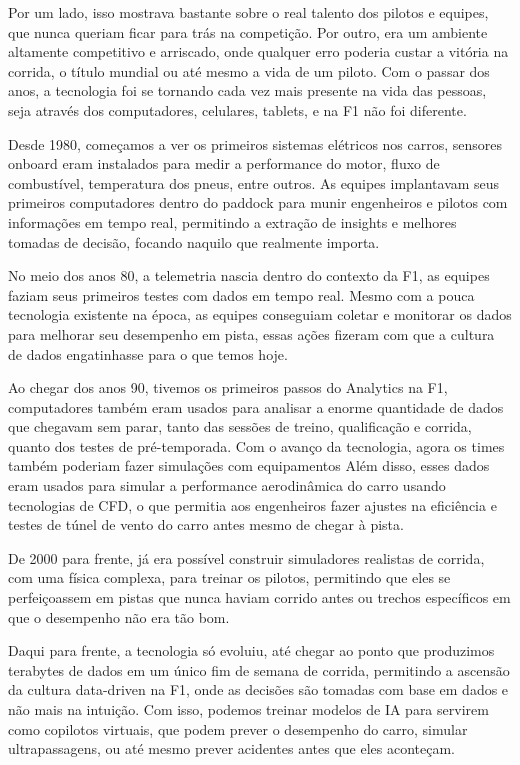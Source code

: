 \documentclass[12pt, %
openright, 
oneside, %
a4paper,    %
brazil]{facom-ufu-abntex2}
\begin{document}
Por um lado, isso mostrava bastante sobre o real talento dos pilotos e equipes, que nunca queriam ficar para trás na competição. Por outro, era um ambiente altamente competitivo e arriscado, onde qualquer erro poderia custar
a vitória na corrida, o título mundial ou até mesmo a vida de um piloto. Com o passar dos anos, a tecnologia foi se tornando cada vez mais presente na vida das pessoas, seja através dos computadores, celulares, tablets, e na F1 não foi diferente.

Desde 1980, começamos a ver os primeiros sistemas elétricos nos carros, sensores onboard eram instalados para medir a performance do motor, fluxo de combustível, temperatura dos pneus, entre outros.
As equipes implantavam seus primeiros computadores dentro do paddock para munir engenheiros e pilotos com informações em tempo real, permitindo a extração de insights e melhores tomadas de decisão, focando naquilo que realmente importa.

No meio dos anos 80, a telemetria nascia dentro do contexto da F1, as equipes faziam seus primeiros testes com dados em tempo real.
Mesmo com a pouca tecnologia existente na época, as equipes conseguiam coletar e monitorar os dados para melhorar seu desempenho em pista,
essas ações fizeram com que a cultura de dados engatinhasse para o que temos hoje.

Ao chegar dos anos 90, tivemos os primeiros passos do Analytics na F1, computadores também eram usados para analisar a enorme quantidade de dados que chegavam sem parar,
tanto das sessões de treino, qualificação e corrida, quanto dos testes de pré-temporada. Com o avanço da tecnologia, agora os times também poderiam fazer simulações com equipamentos
Além disso, esses dados eram usados para simular a performance aerodinâmica do carro usando tecnologias de CFD, o que permitia aos engenheiros fazer ajustes na eficiência 
e testes de túnel de vento do carro antes mesmo de chegar à pista.

De 2000 para frente, já era possível construir simuladores realistas de corrida, com uma física complexa, para treinar os pilotos, permitindo que eles se perfeiçoassem em pistas que nunca haviam corrido antes ou trechos específicos em que o desempenho não era tão bom.

Daqui para frente, a tecnologia só evoluiu, até chegar ao ponto que produzimos terabytes de dados em um único fim de semana de corrida, permitindo a ascensão da cultura data-driven na F1, onde as decisões são tomadas com base em dados e não mais na intuição.
Com isso, podemos treinar modelos de IA para servirem como copilotos virtuais, que podem prever o desempenho do carro, simular ultrapassagens, ou até mesmo prever acidentes antes que eles aconteçam.
\end{document}
